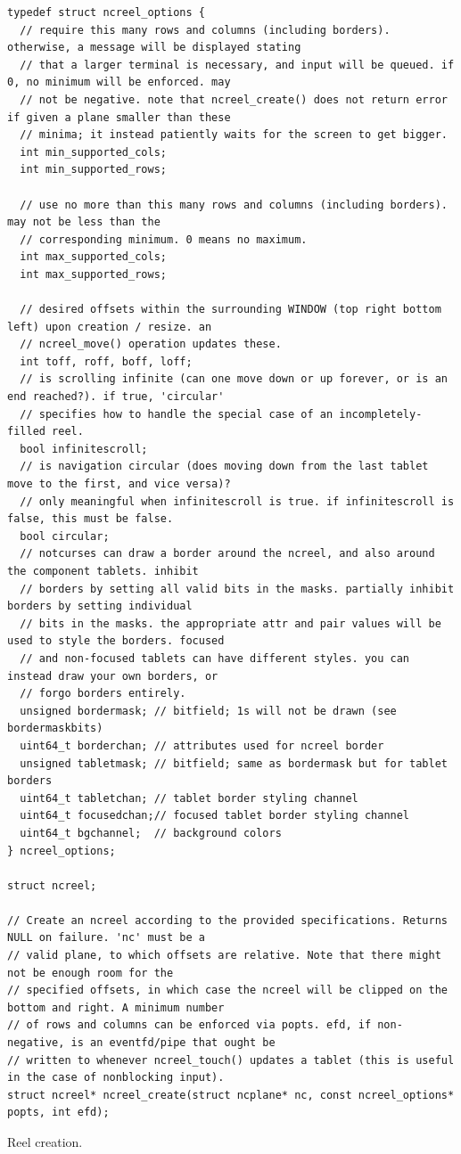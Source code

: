 \documentclass[letterpaper,10pt]{article}
\begin{document}
\begin{listing}[!htb]
\begin{verbatim}
typedef struct ncreel_options {
  // require this many rows and columns (including borders). otherwise, a message will be displayed stating
  // that a larger terminal is necessary, and input will be queued. if 0, no minimum will be enforced. may
  // not be negative. note that ncreel_create() does not return error if given a plane smaller than these
  // minima; it instead patiently waits for the screen to get bigger.
  int min_supported_cols;
  int min_supported_rows;

  // use no more than this many rows and columns (including borders). may not be less than the
  // corresponding minimum. 0 means no maximum.
  int max_supported_cols;
  int max_supported_rows;

  // desired offsets within the surrounding WINDOW (top right bottom left) upon creation / resize. an
  // ncreel_move() operation updates these.
  int toff, roff, boff, loff;
  // is scrolling infinite (can one move down or up forever, or is an end reached?). if true, 'circular'
  // specifies how to handle the special case of an incompletely-filled reel.
  bool infinitescroll;
  // is navigation circular (does moving down from the last tablet move to the first, and vice versa)?
  // only meaningful when infinitescroll is true. if infinitescroll is false, this must be false.
  bool circular;
  // notcurses can draw a border around the ncreel, and also around the component tablets. inhibit
  // borders by setting all valid bits in the masks. partially inhibit borders by setting individual
  // bits in the masks. the appropriate attr and pair values will be used to style the borders. focused
  // and non-focused tablets can have different styles. you can instead draw your own borders, or
  // forgo borders entirely.
  unsigned bordermask; // bitfield; 1s will not be drawn (see bordermaskbits)
  uint64_t borderchan; // attributes used for ncreel border
  unsigned tabletmask; // bitfield; same as bordermask but for tablet borders
  uint64_t tabletchan; // tablet border styling channel
  uint64_t focusedchan;// focused tablet border styling channel
  uint64_t bgchannel;  // background colors
} ncreel_options;

struct ncreel;

// Create an ncreel according to the provided specifications. Returns NULL on failure. 'nc' must be a
// valid plane, to which offsets are relative. Note that there might not be enough room for the
// specified offsets, in which case the ncreel will be clipped on the bottom and right. A minimum number
// of rows and columns can be enforced via popts. efd, if non-negative, is an eventfd/pipe that ought be
// written to whenever ncreel_touch() updates a tablet (this is useful in the case of nonblocking input).
struct ncreel* ncreel_create(struct ncplane* nc, const ncreel_options* popts, int efd);
\end{verbatim}
\caption{Reel creation.}
\label{listing:reelopts}
\end{listing}
\end{document}
